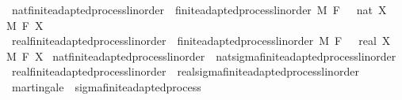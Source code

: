 \begin{isabellebody}
\isanewline
{}\isamarkupfalse%
\ nat{\isacharunderscore}{\kern0pt}finite{\isacharunderscore}{\kern0pt}adapted{\isacharunderscore}{\kern0pt}process{\isacharunderscore}{\kern0pt}linorder\ {\isacharequal}{\kern0pt}\ finite{\isacharunderscore}{\kern0pt}adapted{\isacharunderscore}{\kern0pt}process{\isacharunderscore}{\kern0pt}linorder\ M\ F\ {\isachardoublequoteopen}{}\ {\isacharcolon}{\kern0pt}{\isacharcolon}{\kern0pt}\ nat{\isachardoublequoteclose}\ X\ \ M\ F\ X\isanewline
{}\isamarkupfalse%
\ real{\isacharunderscore}{\kern0pt}finite{\isacharunderscore}{\kern0pt}adapted{\isacharunderscore}{\kern0pt}process{\isacharunderscore}{\kern0pt}linorder\ {\isacharequal}{\kern0pt}\ finite{\isacharunderscore}{\kern0pt}adapted{\isacharunderscore}{\kern0pt}process{\isacharunderscore}{\kern0pt}linorder\ M\ F\ {\isachardoublequoteopen}{}\ {\isacharcolon}{\kern0pt}{\isacharcolon}{\kern0pt}\ real{\isachardoublequoteclose}\ X\ \ M\ F\ X\isanewline
\isanewline
{}\isamarkupfalse%
\ nat{\isacharunderscore}{\kern0pt}finite{\isacharunderscore}{\kern0pt}adapted{\isacharunderscore}{\kern0pt}process{\isacharunderscore}{\kern0pt}linorder\ {\isasymsubseteq}\ nat{\isacharunderscore}{\kern0pt}sigma{\isacharunderscore}{\kern0pt}finite{\isacharunderscore}{\kern0pt}adapted{\isacharunderscore}{\kern0pt}process{\isacharunderscore}{\kern0pt}linorder%
\isadelimproof
\ %
\endisadelimproof
%
\isatagproof
\isacommand{{\isachardot}{\kern0pt}{\isachardot}{\kern0pt}}\isamarkupfalse%
%
\endisatagproof
{\isafoldproof}%
%
\isadelimproof
%
\endisadelimproof
\isanewline
{}\isamarkupfalse%
\ real{\isacharunderscore}{\kern0pt}finite{\isacharunderscore}{\kern0pt}adapted{\isacharunderscore}{\kern0pt}process{\isacharunderscore}{\kern0pt}linorder\ {\isasymsubseteq}\ real{\isacharunderscore}{\kern0pt}sigma{\isacharunderscore}{\kern0pt}finite{\isacharunderscore}{\kern0pt}adapted{\isacharunderscore}{\kern0pt}process{\isacharunderscore}{\kern0pt}linorder%
\isadelimproof
\ %
\endisadelimproof
%
\isatagproof
\isacommand{{\isachardot}{\kern0pt}{\isachardot}{\kern0pt}}\isamarkupfalse%
%
\endisatagproof
{\isafoldproof}%
%
\isadelimproof
%
\endisadelimproof
%
\isadelimdocument
%
\endisadelimdocument
%
\isatagdocument
%
\isamarkuptrue%
%
\endisatagdocument
{\isafolddocument}%
%
\isadelimdocument
%
\endisadelimdocument
{}\isamarkupfalse%
\ martingale\ {\isacharequal}{\kern0pt}\ sigma{\isacharunderscore}{\kern0pt}finite{\isacharunderscore}{\kern0pt}adapted{\isacharunderscore}{\kern0pt}process\ {\isacharplus}{\kern0pt}\isanewline

\end{isabellebody}
